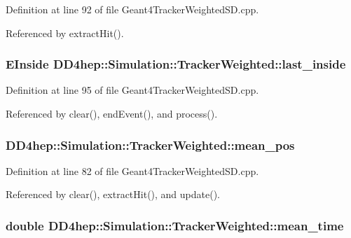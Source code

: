 Definition at line 92 of file Geant4TrackerWeightedSD.cpp.

Referenced by extractHit().\hypertarget{struct_d_d4hep_1_1_simulation_1_1_tracker_weighted_afc2a6289bb11f08b03d50e0b8e271083}{
\subsubsection[{last\_\-inside}]{\setlength{\rightskip}{0pt plus 5cm}EInside {\bf DD4hep::Simulation::TrackerWeighted::last\_\-inside}}}
\label{struct_d_d4hep_1_1_simulation_1_1_tracker_weighted_afc2a6289bb11f08b03d50e0b8e271083}


Definition at line 95 of file Geant4TrackerWeightedSD.cpp.

Referenced by clear(), endEvent(), and process().\hypertarget{struct_d_d4hep_1_1_simulation_1_1_tracker_weighted_ab378f01fcca56a21b21f3d90c600c984}{
\subsubsection[{mean\_\-pos}]{ {\bf DD4hep::Simulation::TrackerWeighted::mean\_\-pos}}}
\label{struct_d_d4hep_1_1_simulation_1_1_tracker_weighted_ab378f01fcca56a21b21f3d90c600c984}


Definition at line 82 of file Geant4TrackerWeightedSD.cpp.

Referenced by clear(), extractHit(), and update().\hypertarget{struct_d_d4hep_1_1_simulation_1_1_tracker_weighted_a222fd48188979006e286b3688452ff6d}{
\subsubsection[{mean\_\-time}]{\setlength{\rightskip}{0pt plus 5cm}double {\bf DD4hep::Simulation::TrackerWeighted::mean\_\-time}}}
\label{struct_d_d4hep_1_1_simulation_1_1_tracker_weighted_a222fd48188979006e286b3688452ff6d}



